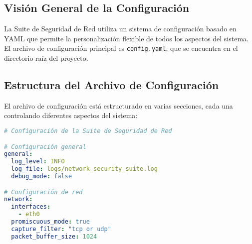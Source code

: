 \subsection{Visión General de la Configuración}
La Suite de Seguridad de Red utiliza un sistema de configuración basado en YAML que permite la personalización flexible de todos los aspectos del sistema. El archivo de configuración principal es \texttt{config.yaml}, que se encuentra en el directorio raíz del proyecto.

\subsection{Estructura del Archivo de Configuración}
El archivo de configuración está estructurado en varias secciones, cada una controlando diferentes aspectos del sistema:

\begin{lstlisting}[language=yaml, caption=Estructura del Archivo de Configuración]
# Configuración de la Suite de Seguridad de Red

# Configuración general
general:
  log_level: INFO
  log_file: logs/network_security_suite.log
  debug_mode: false

# Configuración de red
network:
  interfaces:
    - eth0
  promiscuous_mode: true
  capture_filter: "tcp or udp"
  packet_buffer_size: 1024
\end{lstlisting}

